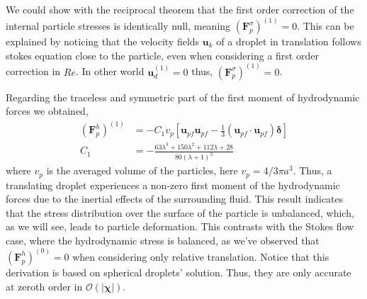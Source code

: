 We could show with the reciprocal theorem that the first order correction of the internal particle stresses is identically null, meaning $(\textbf{F}^\sigma_p)^{(1)} = 0$. 
This can be explained by noticing that the velocity fields $\textbf{u}_k$ of a droplet in translation follows stokes equation close to the particle, even when considering a first order correction in $Re$.
In other world $\textbf{u}^{(1)}_d =0 $ thus,  $(\textbf{F}^\sigma_p)^{(1)} = 0$. 

Regarding the traceless and symmetric part of the first moment of hydrodynamic forces we obtained, 
\begin{align}
    (\textbf{F}^h_p)^{(1)}  
    &=
    - C_1 v_p
    [
        \textbf{u}_{pf}\textbf{u}_{pf} - \frac{1}{3}(\textbf{u}_{pf}\cdot \textbf{u}_{pf})\bm\delta 
    ]\\
    C_1 &=
    - \frac{63 \lambda^{3} + 150 \lambda^{2} + 112 \lambda + 28}{80 \left(\lambda + 1\right)^{3}}
    \label{eq:closure_sigma_e}
\end{align}
where $v_p$ is the averaged volume of the particles, here $v_p = 4/3 \pi a^3$.  
Thus, a translating droplet experiences a non-zero first moment of the hydrodynamic forces due to the inertial effects of the surrounding fluid. This result indicates that the stress distribution over the surface of the particle is unbalanced, which, as we will see, leads to particle deformation.
This contrasts with the Stokes flow case, where the hydrodynamic stress is balanced, as we've observed that $(\textbf{F}^h_p)^{(0)} = 0$ when considering only relative translation.  
Notice that this derivation is based on spherical droplets' solution. 
Thus, they are only accurate at zeroth order in  $\mathcal{O}(|\bm\chi|)$. 


